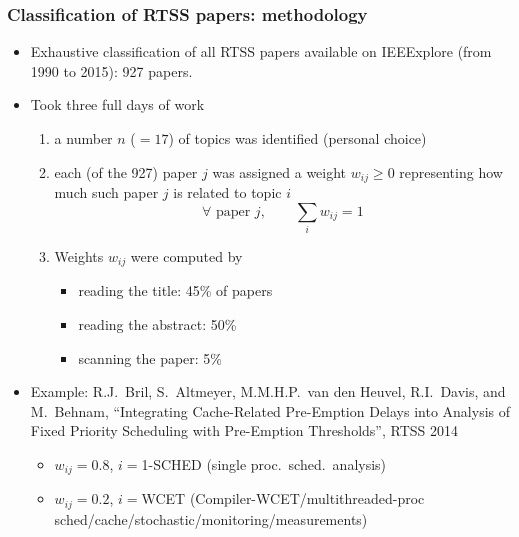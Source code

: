 \documentclass[ignorenonframetext,mathserif]{beamer} %
\begin{document}
\begin{frame}
  \frametitle{Classification of RTSS papers: methodology}
  
  \begin{itemize}
  \item Exhaustive classification of all RTSS papers available on
    IEEExplore (from 1990 to 2015): 927 papers.  
  \item Took three full days of work
    \begin{enumerate}
    \item a number $n$ ($=17$) of topics was identified (personal
      choice)
    \item each (of the 927) paper $j$ was assigned a weight
      $w_{ij}\geq 0$ representing how much such paper $j$ is related
      to topic $i$
      \[
      \forall \text{ paper } j,\qquad\sum_i w_{ij}= 1
      \]
    \item Weights $w_{ij}$ were computed by
      \begin{itemize}
      \item reading the title: 45\% of papers
      \item reading the abstract: 50\%
      \item scanning the paper: 5\%
      \end{itemize}
    \end{enumerate}
  \item Example: R.J.~Bril, S.~Altmeyer, M.M.H.P.~van den Heuvel,
    R.I.~Davis, and M.~Behnam, ``Integrating Cache-Related Pre-Emption
    Delays into Analysis of Fixed Priority Scheduling with Pre-Emption
    Thresholds'', RTSS 2014
    \begin{itemize}
    \item $w_{ij}=0.8$, $i=$1-SCHED (single proc.~sched.~analysis)
    \item $w_{ij}=0.2$, $i=$WCET (Compiler-WCET/multithreaded-proc
      sched/cache/stochastic/monitoring/measurements)
    \end{itemize}
  \end{itemize}
\end{frame}
\end{document}
